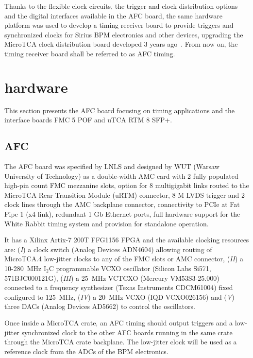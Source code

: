 \documentclass[a4paper,
               biblatex,      %
               ]{jacow}
\begin{document}
Thanks to the flexible clock circuits, the trigger and clock distribution options and the digital interfaces available in the AFC board, the same hardware platform was used to develop a timing receiver board to provide triggers and synchronized clocks for Sirius BPM electronics and other devices, upgrading the MicroTCA clock distribution board developed 3 years ago~\cite{timing_icalepcs15}. From now on, the timing receiver board shall be referred to as AFC timing. 

\section{hardware}
This section presents the AFC board focusing on timing applications and the interface boards FMC 5 POF and uTCA RTM 8 SFP+.

\subsection{AFC}

The AFC board was specified by LNLS and designed by WUT (Warsaw University of Technology) as a double-width AMC card with 2 fully populated high-pin count FMC mezzanine slots, option for 8 multigigabit links routed to the MicroTCA Rear Transition Module (uRTM) connector, 8 M-LVDS trigger and 2 clock lines through the AMC backplane connector, connectivity to PCIe at Fat Pipe 1 (x4 link), redundant 1 Gb Ethernet ports, full hardware support for the White Rabbit timing system and provision for standalone operation. 

It has a Xilinx Artix-7 200T FFG1156 FPGA and the available clocking resources are: (\textit{I}) a clock switch (Analog Devices ADN4604) allowing routing of MicroTCA.4 low-jitter clocks to any of the FMC slots or AMC connector, (\textit{II}) a 10-280~MHz I$_{2}$C programmable VCXO oscillator (Silicon Labs Si571, 571BJC000121G), (\textit{III}) a 25~MHz VCTCXO (Mercury VM53S3-25.000) connected to a frequency synthesizer (Texas Instruments CDCM61004) fixed configured to 125~MHz, (\textit{IV}) a 20~MHz VCXO (IQD VCXO026156) and (\textit{V}) three DACs (Analog Devices AD5662) to control the oscillators. 

Once inside a MicroTCA crate, an AFC timing should output triggers and a low-jitter synchronized clock to the other AFC boards running in the same crate through the MicroTCA crate backplane. The low-jitter clock will be used as a reference clock from the ADCs of the BPM electronics.
\end{document}

